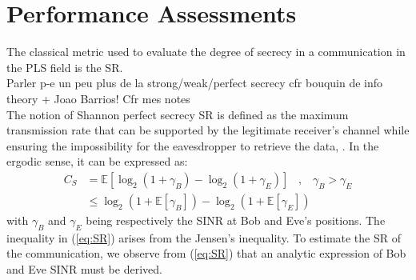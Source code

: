 \documentclass[journal,comsoc]{IEEEtran}
\newcommand{\EX}[1]{\mathbb{E} \left[#1\right]}%
\begin{document}
\section{Performance Assessments}
\label{sec:perf}
The classical metric used to evaluate the degree of secrecy in a communication in the PLS field is the SR.\\
{\color{red} Parler p-e un peu plus de la strong/weak/perfect secrecy cfr bouquin de info theory + Joao Barrios! Cfr mes notes}\\
{\color{red}The notion of Shannon perfect secrecy} SR is defined as the maximum transmission rate that can be supported by the legitimate receiver's channel while ensuring the impossibility for the eavesdropper to retrieve the data, \cite{7348007}. In the ergodic sense, it can be expressed as:
\begin{equation}
\begin{split}
C_S &=  \EX{\log_2{\left(1+\gamma_B\right)} - \log_2{\left(1+\gamma_E\right)}} \; \; \; , \; \; \;  \gamma_B > \gamma_E \\
&\leq   \log_2 \left( 1+ \EX{\gamma_B} \right) - \log_2 \left( 1+ \EX{\gamma_E}\right) 
\end{split}
\label{eq:SR}
\end{equation}
with $\gamma_B$ and $\gamma_E$ being respectively the SINR at Bob and Eve's positions. The inequality in (\ref{eq:SR}) arises from the Jensen's inequality. To estimate the SR of the communication, we observe from (\ref{eq:SR}) that an analytic expression of Bob and Eve SINR must be derived.



\end{document}
